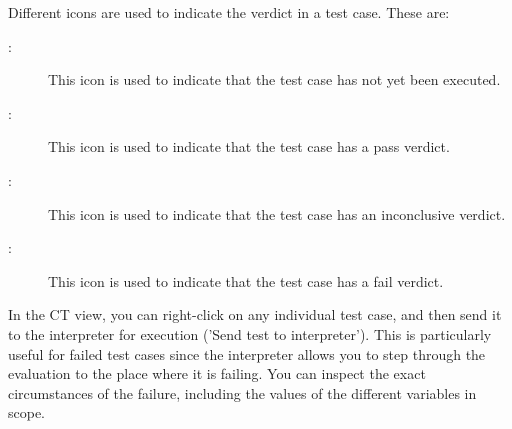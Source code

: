 \documentclass{overturerepchap}
\begin{document}
Different icons are used to indicate the verdict in a test
case. These are:
\begin{description}
\item[\hspace{-1.8mm}
:]
  This icon is used to indicate that the test case has not yet been
  executed.
\item[\hspace{-1.8mm}
:]
  This icon is used to indicate that the test case has a pass
  verdict.
\item[\hspace{-1.8mm}
:]
  This icon is used to indicate that the test case has an inconclusive
  verdict.
\item[\hspace{-1.8mm}
:]
  This icon is used to indicate that the test case has a fail
  verdict.
\end{description}


In the CT view, you can right-click on any individual
test case, and then send it to the interpreter for execution ('Send test to interpreter'). This is particularly useful for
failed test cases since the interpreter allows you to step through the
evaluation to the place where it is failing. You can inspect the exact
circumstances of the failure, including the values of the different
variables in scope.
\end{document}
